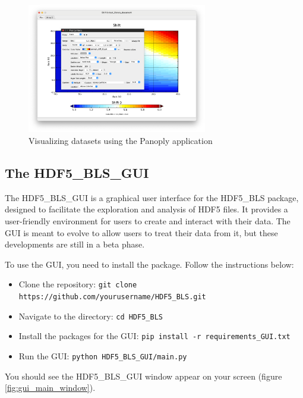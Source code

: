 \documentclass{article}
\begin{document}
\begin{figure}[H]
    \centering
    \includegraphics[width=0.7\textwidth]{img/Panoply_viewer.png}
    \caption{Visualizing datasets using the Panoply application} 
    \label{fig:panoply_viewer}
\end{figure}

\subsection{The HDF5\_BLS\_GUI}

The HDF5\_BLS\_GUI is a graphical user interface for the HDF5\_BLS package, designed to facilitate the exploration and analysis of HDF5 files. It provides a user-friendly environment for users to create and interact with their data. The GUI is meant to evolve to allow users to treat their data from it, but these developments are still in a beta phase. 

To use the GUI, you need to install the package. Follow the instructions below:

\begin{itemize}
    \item Clone the repository: \texttt{git clone https://github.com/yourusername/HDF5\_BLS.git}
    \item Navigate to the directory: \texttt{cd HDF5\_BLS}
    \item Install the packages for the GUI: \texttt{pip install -r requirements\_GUI.txt}
    \item Run the GUI: \texttt{python HDF5\_BLS\_GUI/main.py}
\end{itemize}

You should see the HDF5\_BLS\_GUI window appear on your screen (figure \ref{fig:gui_main_window}).
\end{document}
